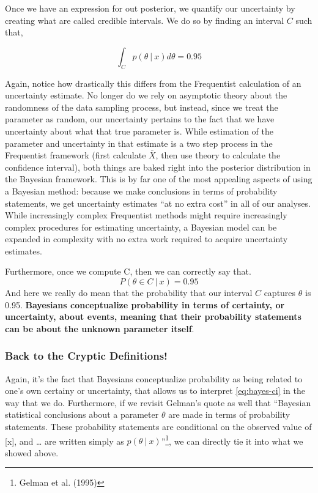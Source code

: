 \documentclass[12pt,twoside]{reedthesis}
\begin{document}
Once we have an expression for out posterior, we quantify our uncertainty by creating what are called credible intervals. We do so by finding an interval \(C\) such that,

\[
\int_C p(\theta \ | \ x)d\theta = 0.95
\]

Again, notice how drastically this differs from the Frequentist calculation of an uncertainty estimate. No longer do we rely on asymptotic theory about the randomness of the data sampling process, but instead, since we treat the parameter as random, our uncertainty pertains to the fact that we have uncertainty about what that true parameter is. While estimation of the parameter and uncertainty in that estimate is a two step process in the Frequentist framework (first calculate \(\bar{X}\), then use theory to calculate the confidence interval), both things are baked right into the posterior distribution in the Bayesian framework. This is by far one of the most appealing aspects of using a Bayesian method: because we make conclusions in terms of probability statements, we get uncertainty estimates ``at no extra cost'' in all of our analyses. While increasingly complex Frequentist methods might require increasingly complex procedures for estimating uncertainty, a Bayesian model can be expanded in complexity with no extra work required to acquire uncertainty estimates.

Furthermore, once we compute C, then we can correctly say that.
\begin{equation}
  P(\theta \in C \ | \ x) = 0.95
  \label{eq:bayes-ci}
\end{equation}
And here we really do mean that the probability that our interval \(C\) captures \(\theta\) is 0.95. \textbf{Bayesians conceptualize probability in terms of certainty, or uncertainty, about events, meaning that their probability statements can be about the unknown parameter itself}.

\hypertarget{back-to-the-cryptic-definitions}{%
\subsubsection{Back to the Cryptic Definitions!}\label{back-to-the-cryptic-definitions}}

Again, it's the fact that Bayesians conceptualize probability as being related to one's own certainy or uncertainty, that allows us to interpret \eqref{eq:bayes-ci} in the way that we do. Furthermore, if we revisit Gelman's quote as well that ``Bayesian statistical conclusions about a parameter \(\theta\) are made in terms of probability statements. These probability statements are conditional on the observed value of {[}x{]}, and \ldots{} are written simply as \(p(\theta \ | \ x)\)''\footnote{Gelman et al. (1995)}, we can directly tie it into what we showed above.
\end{document}

